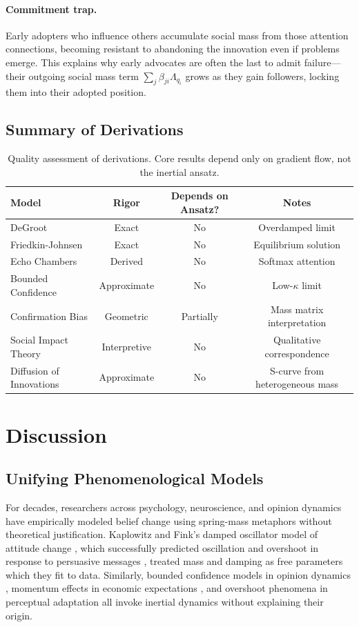 \documentclass[12pt]{article}
\begin{document}
\paragraph{Commitment trap.} Early adopters who influence others accumulate social mass from those attention connections, becoming resistant to abandoning the innovation even if problems emerge. This explains why early advocates are often the last to admit failure---their outgoing social mass term $\sum_j \beta_{ji}\Lambda_{q_i}$ grows as they gain followers, locking them into their adopted position.

\subsection{Summary of Derivations}

\begin{table}[h]
\centering
\begin{tabular}{@{}lccc@{}}
\toprule
\textbf{Model} & \textbf{Rigor} & \textbf{Depends on Ansatz?} & \textbf{Notes} \\
\midrule
DeGroot & Exact & No & Overdamped limit \\
Friedkin-Johnsen & Exact & No & Equilibrium solution \\
Echo Chambers & Derived & No & Softmax attention \\
Bounded Confidence & Approximate & No & Low-$\kappa$ limit \\
Confirmation Bias & Geometric & Partially & Mass matrix interpretation \\
Social Impact Theory & Interpretive & No & Qualitative correspondence \\
Diffusion of Innovations & Approximate & No & S-curve from heterogeneous mass \\
\bottomrule
\end{tabular}
\caption{Quality assessment of derivations. Core results depend only on gradient flow, not the inertial ansatz.}
\label{tab:rigor}
\end{table}


\section{Discussion}

\subsection{Unifying Phenomenological Models}

For decades, researchers across psychology, neuroscience, and opinion dynamics have empirically modeled belief change using spring-mass metaphors without theoretical justification. Kaplowitz and Fink's damped oscillator model of attitude change \citet{kaplowitz1983, kaplowitz1992}, which successfully predicted oscillation and overshoot in response to persuasive messages \citep{fink2002}, treated mass and damping as free parameters which they fit to data. Similarly, bounded confidence models in opinion dynamics \citep{hegselmann2002, deffuant2000}, momentum effects in economic expectations \citep{coibion2015}, and overshoot phenomena in perceptual adaptation \citep{webster2015} all invoke inertial dynamics without explaining their origin.
\end{document}
